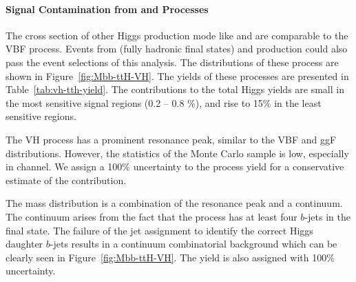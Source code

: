 \paragraph{Signal Contamination from \VH and \ttH Processes}

The cross section of other Higgs production mode like \VH and \ttH are comparable to
the VBF process. Events from \VH (fully hadronic final states) and \ttH production could 
also pass the event selections of this analysis. The \Mbb distributions of these process
 are shown in Figure~\ref{fig:Mbb-ttH-VH}. The yields of these processes are presented 
in Table~\ref{tab:vh-tth-yield}.  The contributions to the total Higgs yields are  small 
in the most sensitive signal regions (0.2 -- 0.8 \%),  and rise to 15\% in the least sensitive regions.  

The VH process has a prominent resonance peak, similar to the VBF and ggF distributions. However, 
the statistics of the Monte Carlo sample is low, especially in \twocentral channel. 
We assign a 100\% uncertainty to the \VH process yield for a conservative estimate of 
the \VH contribution. %

The \ttH mass distribution is a combination of the resonance peak and a continuum. 
The continuum arises from the fact that the \ttH process has at least four $b$-jets in the final state.
The failure of the jet assignment to identify the correct Higgs daughter $b$-jets results in a 
continuum combinatorial background which can be clearly seen in Figure~\ref{fig:Mbb-ttH-VH}. 
The yield is also assigned with 100\% uncertainty.


